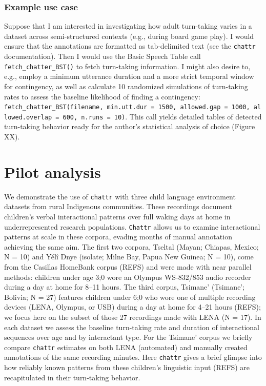 \documentclass[10pt, letterpaper]{article}
\begin{document}
\hypertarget{example-use-case}{%
\subsubsection{Example use case}\label{example-use-case}}

Suppose that I am interested in investigating how adult turn-taking
varies in a dataset across semi-structured contexts (e.g., during board
game play). I would ensure that the annotations are formatted as
tab-delimited text (see the \texttt{chattr} documentation). Then I would
use the Basic Speech Table call \texttt{fetch\_chatter\_BST()} to fetch
turn-taking information. I might also desire to, e.g., employ a minimum
utterance duration and a more strict temporal window for contingency, as
well as calculate 10 randomized simulations of turn-taking rates to
assess the baseline likelihood of finding a contingency:
\texttt{fetch\_chatter\_BST(filename,\ min.utt.dur\ =\ 1500,\ allowed.gap\ =\ 1000,\ allowed.overlap\ =\ 600,\ n.runs\ =\ 10)}.
This call yields detailed tables of detected turn-taking behavior ready
for the author's statistical analysis of choice (Figure XX).

\hypertarget{pilot-analysis}{%
\section{Pilot analysis}\label{pilot-analysis}}

We demonstrate the use of \texttt{chattr} with three child language
environment datasets from rural Indigenous communities. These recordings
document children's verbal interactional patterns over full waking days
at home in underrepresented research populations. \texttt{Chattr} allows
us to examine interactional patterns at scale in these corpora, evading
months of manual annotation achieving the same aim. The first two
corpora, Tseltal (Mayan; Chiapas, Mexico; N = 10) and Yélî Dnye
(isolate; Milne Bay, Papua New Guinea; N = 10), come from the Casillas
HomeBank corpus (REFS) and were made with near parallel methods:
children under age 3;0 wore an Olympus WS-832/853 audio recorder during
a day at home for 8--11 hours. The third corpus, Tsimane' (Tsimane';
Bolivia; N = 27) features children under 6;0 who wore one of multiple
recording devices (LENA, Olympus, or USB) during a day at home for 4--21
hours (REFS); we focus here on the subset of those 27 recordings made
with LENA (N = 17). In each dataset we assess the baseline turn-taking
rate and duration of interactional sequences over age and by interactant
type. For the Tsimane' corpus we briefly compare \texttt{chattr}
estimates on both LENA (automated) and manually created annotations of
the same recording minutes. Here \texttt{chattr} gives a brief glimpse
into how reliably known patterns from these children's linguistic input
(REFS) are recapitulated in their turn-taking behavior.
\end{document}
